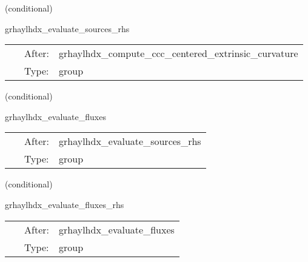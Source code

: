 \vspace{5mm}

   (conditional) 

\hspace{5mm} grhaylhdx\_evaluate\_sources\_rhs 

\hspace{5mm}{\it evaluate source terms in grhd rhss } 


\hspace{5mm}

 \begin{tabular*}{160mm}{cll} 
~ & After:  & grhaylhdx\_compute\_ccc\_centered\_extrinsic\_curvature \\ 
~ & Type:  & group \\ 
\end{tabular*} 


\vspace{5mm}

   (conditional) 

\hspace{5mm} grhaylhdx\_evaluate\_fluxes 

\hspace{5mm}{\it evaluate fluxes for grhd rhss } 


\hspace{5mm}

 \begin{tabular*}{160mm}{cll} 
~ & After:  & grhaylhdx\_evaluate\_sources\_rhs \\ 
~ & Type:  & group \\ 
\end{tabular*} 


\vspace{5mm}

   (conditional) 

\hspace{5mm} grhaylhdx\_evaluate\_fluxes\_rhs 

\hspace{5mm}{\it evaluate flux terms in grhd rhss } 


\hspace{5mm}

 \begin{tabular*}{160mm}{cll} 
~ & After:  & grhaylhdx\_evaluate\_fluxes \\ 
~ & Type:  & group \\ 
\end{tabular*} 


